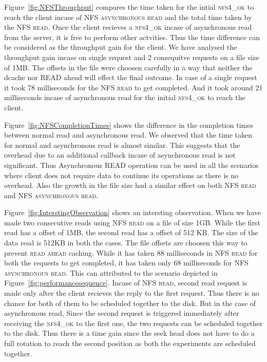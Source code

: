 Figure~\ref{fig:NFSThroughput} compares the  time taken for the intial \textsc{nfs4\_ok} to reach the client incase of \textsc{NFS asynchronous read} and the total time taken by the \textsc{NFS read}.
Once the client recieves a \textsc{nfs4\_ok}  incase of asynchronous read from the server, it is free to perform other actvities. Thus the time difference can be considered as the throughput gain for the client. We have analysed the throughput gain incase on single request and 2 consequitve requests on a file size of 1MB. The offsets in the file were choosen carefully in a way that neither the dcache nor READ ahead will effect the final outcome. In case of a single request it took 78 milliseconds for the 
\textsc{NFS read} to get completed. And it took around 21 milliseconds incase of asynchronous read for the initial \textsc{nfs4\_ok}  to reach the client. 



	Figure~\ref{fig:NFSCompletionTimes} shows the  difference in the completion times between normal read and asynchronous read. We observed that the time taken for normal and asynchronous read is almost similar. This suggests that the overhead due to an additional callback incase of asynchronous read is not significant. Thus Asynchronous READ operation can be used in all the scenarios where client does not require data to continue its operations as there is no overhead. Also the growth in the file size had a similar effect on both \textsc{NFS read} and \textsc{NFS asynchronous read}. 


 Figure~\ref{fig:InterstingObservation} shows an intersting observation. When we have made two consecutive reads  using \textsc{NFS read} on a file of size 1GB. While the first read has a offset of 1MB, the second read has a offset of 512 KB. The size of the data read is 512KB in both the cases. The file offsets are choosen this way to prevent \textsc{read ahead} caching. While it has taken 88 milliseconds  in \textsc{NFS read} for both the requests to get completed, it has taken only 68 milliseconds for \textsc{NFS asynchronous read}. This can attributed to the scenario depicted  in   Figure~\ref{fig:performancesequence}. Incase of \textsc{NFS read}, second read request is made only after the client recieves the reply to the first request. Thus there is no chance for both of them to be scheduled together to the disk. But in the case of asynchronous read, Since the second request is triggered immediately after receiving the  \textsc{nfs4\_ok}  to the first one, the two requests can be scheduled together to the disk. Thus there is a time gain since the seek head does not have to do a full rotation to reach the second position as both the experiments are scheduled together.    







